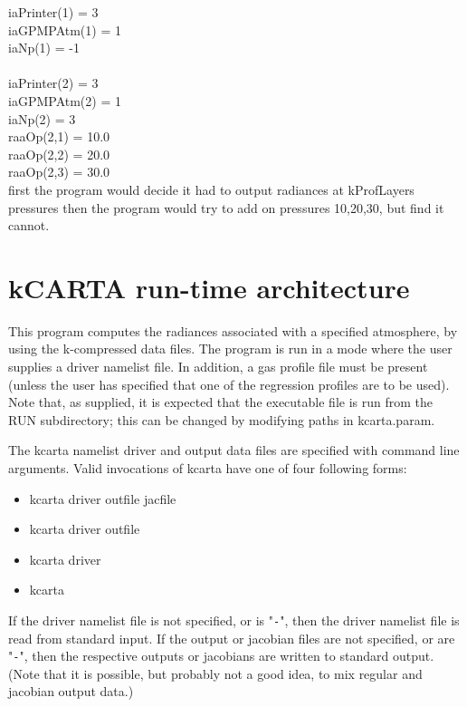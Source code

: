 \documentclass[12pt]{article}
\newcommand{\kc}{\textsf{kCARTA}\xspace}
\newcommand{\ttab}{\indent\indent}
\begin{document}
{{{\medskip
\ttab iaPrinter(1) = 3\\
\ttab  iaGPMPAtm(1) = 1\\
\ttab  iaNp(1) = -1\\
\ttab \\
\ttab iaPrinter(2) = 3\\
\ttab  iaGPMPAtm(2) = 1\\
\ttab  iaNp(2) = 3\\
\ttab  raaOp(2,1) = 10.0 \\
\ttab  raaOp(2,2) = 20.0 \\
\ttab  raaOp(2,3) = 30.0 \\

\medskip\noindent 
first the program would decide it had to output radiances at kProfLayers
pressures then the program would try to add on pressures 10,20,30,
but find it cannot.

\section{\kc run-time architecture}

This program computes the radiances associated with a specified
atmosphere, by using the k-compressed data files.  The program is
run in a mode where the user supplies a driver namelist file.  In addition, a
gas profile file must be present (unless the user has specified that
one of the regression profiles are to be used).  Note that, as
supplied, it is expected that the executable file is run from the
RUN subdirectory; this can be changed by modifying paths in
kcarta.param.

The kcarta namelist driver and output data files are specified with command
line arguments.  Valid invocations of kcarta have one of four
following forms:

\begin{itemize}
  \item kcarta driver outfile jacfile
  \item kcarta driver outfile
  \item kcarta driver   
  \item kcarta
\end{itemize}

If the driver namelist file is not specified, or is "{\tt -}", then the
driver namelist file is read from standard input.  If the output or jacobian
files are not specified, or are "{\tt -}", then the respective
outputs or jacobians are written to standard output.  (Note that it
is possible, but probably not a good idea, to mix regular and
jacobian output data.)

}}}
\end{document}
